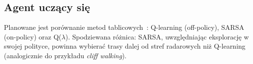 \subsection{Agent uczący się}
\label{sec:algorytm}

Planowane jest porównanie metod tablicowych~\cite{sutton2018}:
Q-learning (off-policy), SARSA (on-policy) oraz Q($\lambda$).
Spodziewana różnica: SARSA, uwzględniając eksplorację w swojej polityce,
powinna wybierać trasy dalej od stref radarowych niż Q-learning
(analogicznie do przykładu \emph{cliff walking}).


